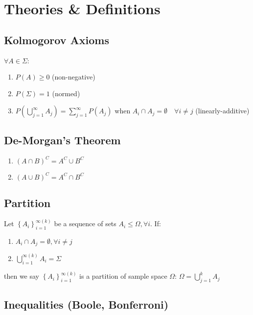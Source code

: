 \documentclass[12pt]{article}
\newcommand{\bb}[1]{\left\{#1\right\}}
\newcommand{\pp}[1]{\left(#1\right)}
\begin{document}
\section{Theories \& Definitions}

\subsection{Kolmogorov Axioms}

$\forall A \in \Sigma$:

\begin{enumerate}
	\item $P(A) \ge 0$ (non-negative)
	\item $P(\Sigma) = 1$ (normed)
	\item $P \pp{\bigcup_{j = 1}^\infty A_j} = \sum_{j = 1}^\infty P(A_j)$ when $A_i \cap A_j = \emptyset \quad \forall i \ne j$ (linearly-additive)
\end{enumerate}

\subsection{De-Morgan's Theorem}

\begin{enumerate}
	\item $(A \cap B)^C = A^C \cup B^C$ 
	\item $(A \cup B)^C = A^C \cap B^C$
\end{enumerate}

\subsection{Partition}

Let $\bb{A_i}_{i = 1}^{\infty (k)}$ be a sequence of sets $A_i \le \Omega, \forall i$. If:

\begin{enumerate}
	\item $A_i \cap A_j = \emptyset, \forall i \ne j$ 
	\item $\bigcup_{i = 1}^{\infty (k)} A_i = \Sigma$
\end{enumerate}

then we say $\bb{A_i}_{i = 1}^{\infty (k)}$ is a partition of sample space $\Omega$: $\Omega = \bigcup_{j = 1}^k A_j$

\subsection{Inequalities (Boole, Bonferroni)}
\end{document}
